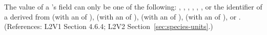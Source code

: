 The value of a \Species's  field can only be one of
the following: , , , ,
, , or the identifier of a
\UnitDefinition derived from  (with an  of
),  (with an  of ), 
(with an  of ),  (with an
 of ), or .  (References: L2V1
Section 4.6.4; L2V2 Section~\ref{sec:species-units}.)
